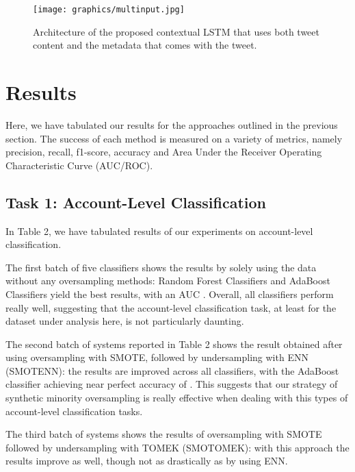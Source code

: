 \begin{figure}
\begin{center}
\texttt{[image: graphics/multinput.jpg]} 
\caption{Architecture of the proposed contextual LSTM that uses both tweet content and the metadata that comes with the tweet.}
\end{center}\vspace*{-.6cm}
\end{figure}

\section{Results}

Here, we have tabulated our results for the approaches outlined in the previous section. The success of each method is measured on a variety of metrics, namely precision, recall, f1-score, accuracy and Area Under the Receiver Operating Characteristic Curve (AUC/ROC).

\subsection{Task 1: Account-Level Classification}

In Table 2, we have tabulated results of our experiments on account-level classification. 

The first batch of five classifiers shows the results by solely using the data without any oversampling methods: Random Forest Classifiers and AdaBoost Classifiers yield the best results, with an AUC . Overall, all classifiers perform really well, suggesting that the account-level classification task, at least for the dataset under analysis here, is not particularly daunting. \par 

The second batch of systems reported in Table 2 shows the result obtained after using  oversampling with SMOTE, followed by undersampling with ENN (SMOTENN): the results are improved across all classifiers, with the AdaBoost classifier achieving near perfect accuracy of . This suggests that our strategy of synthetic minority oversampling is really effective when dealing with this types of account-level classification tasks. 

The third batch of systems shows the results of oversampling with SMOTE followed by undersampling with TOMEK (SMOTOMEK): with this approach  the results improve as well, though not as drastically as by using ENN. \par 

